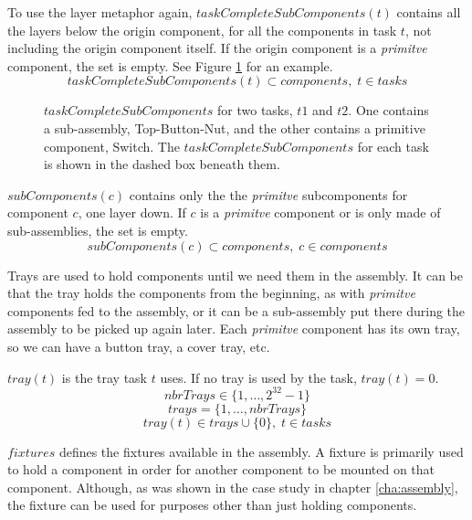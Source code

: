  \noindent To use the layer metaphor again, $taskCompleteSubComponents(t)$ contains all the layers below the origin component, for all the components in task $t$, not including the origin component itself. If the origin component is a \emph{primitve} component, the set is empty. See Figure \ref{fig:taskCompleteSubComponents} for an example.
 \begin{equation}\label{eq:54}
 taskCompleteSubComponents(t) \subset components, \; t \in tasks
 \end{equation}
 
  \begin{figure}
  
  \caption{$taskCompleteSubComponents$ for two tasks, $t1$ and $t2$. One contains a sub-assembly, Top-Button-Nut, and the other contains a primitive component, Switch. The $taskCompleteSubComponents$ for each task is shown in the dashed box beneath them.}
  \label{fig:taskCompleteSubComponents}
  \end{figure}
 
  \noindent $subComponents(c)$ contains only the the \emph{primitve} subcomponents for component $c$, one layer down. If $c$ is a \emph{primitve} component or is only made of sub-assemblies, the set is empty.
 \begin{equation}\label{eq:55}
 subComponents(c) \subset components, \; c \in components
 \end{equation}

  \noindent Trays are used to hold components until we need them in the assembly. It can be that the tray holds the components from the beginning, as with \emph{primitve} components fed to the assembly, or it can be a sub-assembly put there during the assembly to be picked up again later. Each \emph{primitve} component has its own tray, so we can have a button tray, a cover tray, etc.
  
  $tray(t)$ is the tray task $t$ uses. If no tray is used by the task, $tray(t) = 0$.
 \begin{equation}\label{eq:4}
 nbrTrays \in \{1 , \ldots , 2^{32}-1\}
 \end{equation}
 \begin{equation}\label{eq:14}
 trays = \{1 , \ldots , nbrTrays\}
 \end{equation}
 \begin{equation}\label{eq:22}
 tray(t) \in trays \cup \{0\}, \; t \in tasks
 \end{equation}

  \noindent $fixtures$ defines the fixtures available in the assembly. A fixture is primarily used to hold a component in order for another component to be mounted on that component. Although, as was shown in the case study in chapter \ref{cha:assembly}, the fixture can be used for purposes other than just holding components.
  

